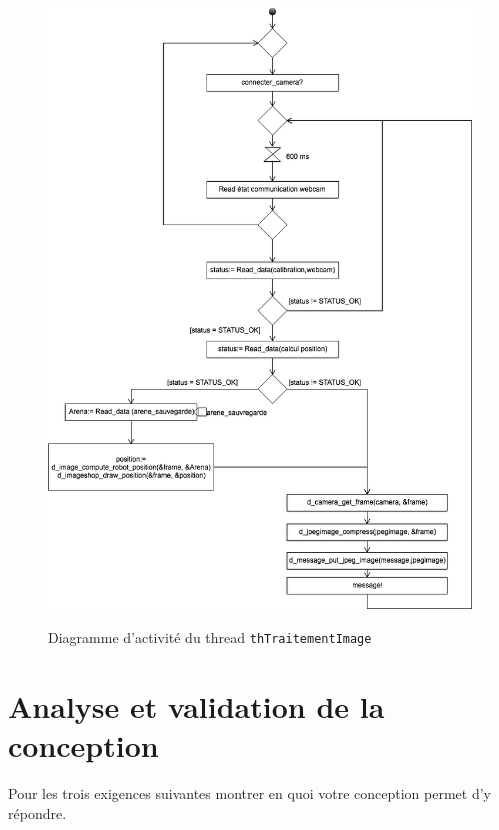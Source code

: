 \documentclass[11pt, a4paper]{paper}
\begin{document}
\begin{figure}[htbp]
\label{fig:act_calibration}
\begin{center}
{\includegraphics[scale=.4]{./figures/traitement_image}}
{\caption{Diagramme d'activité du thread {\tt thTraitementImage}}}
\end{center}
\end{figure}
\FloatBarrier

\newpage

\section{Analyse et validation de la conception}

{\color{red}
Pour les trois exigences suivantes montrer en quoi votre conception permet d’y répondre. }
\end{document}
